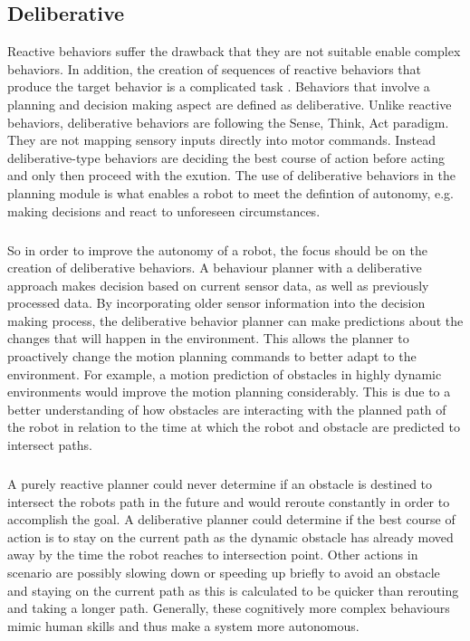 \subsection{Deliberative}
Reactive behaviors suffer the drawback that they are not suitable enable complex behaviors. In addition, the creation of sequences of reactive behaviors that produce the target behavior is a complicated task \cite{murphy2000}. Behaviors that involve a planning and decision making aspect are defined as deliberative. Unlike reactive behaviors, deliberative behaviors are following the Sense, Think, Act paradigm. They are not mapping sensory inputs directly into motor commands. Instead deliberative-type behaviors are deciding the best course of action before acting and only then proceed with the exution. The use of deliberative behaviors in the planning module is what enables a robot to meet the defintion of autonomy, e.g. making decisions and react to unforeseen circumstances. 
\subparagraph*{}
So in order to improve the autonomy of a robot, the focus should be on the creation of deliberative behaviors. A behaviour planner with a deliberative approach makes decision based on current sensor data, as well as previously processed data. By incorporating older sensor information into the decision making process, the deliberative behavior planner can make predictions about the changes that will happen in the environment. This allows the planner to proactively change the motion planning commands to better adapt to the environment. For example, a motion prediction of obstacles in highly dynamic environments would improve the motion planning considerably. This is due to a better understanding of how obstacles are interacting with the planned path of the robot in relation to the time at which the robot and obstacle are predicted to intersect paths. 
\subparagraph*{}
A purely reactive planner could never determine if an obstacle is destined to intersect the robots path in the future and would reroute constantly in order to accomplish the goal. A deliberative planner could determine if the best course of action is to stay on the current path as the dynamic obstacle has already moved away by the time the robot reaches to intersection point. Other actions in scenario are possibly slowing down or speeding up briefly to avoid an obstacle and staying on the current path as this is calculated to be quicker than rerouting and taking a longer path. 
Generally, these cognitively more complex behaviours mimic human skills and thus make a system more autonomous. 

